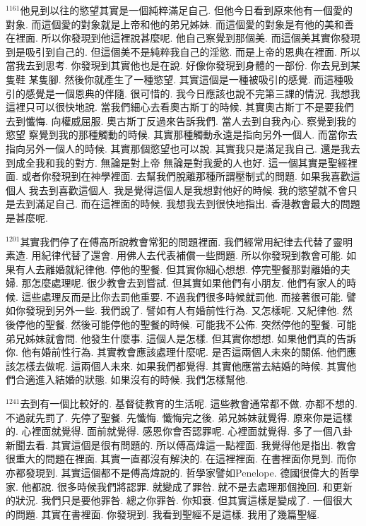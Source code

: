 \documentclass{book}
\begin{document}
$^{1161}$他見到以往的慾望其實是一個純粹滿足自己.
但他今日看到原來他有一個愛的對象.
而這個愛的對象就是上帝和他的弟兄姊妹.
而這個愛的對象是有他的美和善在裡面.
所以你發現到他這裡說甚麼呢.
他自己察覺到那個美.
而這個美其實你發現到是吸引到自己的.
但這個美不是純粹我自己的淫慾.
而是上帝的恩典在裡面.
所以當我去到思考.
你發現到其實他也是在說.
好像你發現到身體的一部份.
你去見到某隻鞋 某隻腳.
然後你就產生了一種慾望.
其實這個是一種被吸引的感覺.
而這種吸引的感覺是一個恩典的伴隨.
很可惜的.
我今日應該也說不完第三課的情況.
我想我這裡只可以很快地說.
當我們細心去看奧古斯丁的時候.
其實奧古斯丁不是要我們去到懺悔.
向權威屈服.
奧古斯丁反過來告訴我們.
當人去到自我內心.
察覺到我的慾望 察覺到我的那種觸動的時候.
其實那種觸動永遠是指向另外一個人.
而當你去指向另外一個人的時候.
其實那個慾望也可以說.
其實我只是滿足我自己.
還是我去到成全我和我的對方.
無論是對上帝 無論是對我愛的人也好.
這一個其實是聖經裡面.
或者你發現到在神學裡面.
去幫我們脫離那種所謂壓制式的問題.
如果我喜歡這個人 我去到喜歡這個人.
我是覺得這個人是我想對他好的時候.
我的慾望就不會只是去到滿足自己.
而在這裡面的時候.
我想我去到很快地指出.
香港教會最大的問題是甚麼呢.

$^{1201}$其實我們停了在傅高所說教會常犯的問題裡面.
我們經常用紀律去代替了靈明素造.
用紀律代替了還會.
用佛人去代表補償一些問題.
所以你發現到教會可能.
如果有人去離婚就紀律他.
停他的聖餐.
但其實你細心想想.
停完聖餐那對離婚的夫婦.
那怎麼處理呢.
很少教會去到嘗試.
但其實如果他們有小朋友.
他們有家人的時候.
這些處理反而是比你去罰他重要.
不過我們很多時候就罰他.
而接著很可能.
譬如你發現到另外一些.
我們說了.
譬如有人有婚前性行為.
又怎樣呢.
又紀律他.
然後停他的聖餐.
然後可能停他的聖餐的時候.
可能我不公佈.
突然停他的聖餐.
可能弟兄姊妹就會問.
他發生什麼事.
這個人是怎樣.
但其實你想想.
如果他們真的告訴你.
他有婚前性行為.
其實教會應該處理什麼呢.
是否這兩個人未來的關係.
他們應該怎樣去做呢.
這兩個人未來.
如果我們都覺得.
其實他應當去結婚的時候.
其實他們合適進入結婚的狀態.
如果沒有的時候.
我們怎樣幫他.

$^{1241}$去到有一個比較好的.
基督徒教育的生活呢.
這些教會通常都不做.
亦都不想的.
不過就先罰了.
先停了聖餐.
先懺悔.
懺悔完之後.
弟兄姊妹就覺得.
原來你是這樣的.
心裡面就覺得.
面前就覺得.
感恩你會否認罪呢.
心裡面就覺得.
多了一個八卦新聞去看.
其實這個是很有問題的.
所以傅高煒這一點裡面.
我覺得他是指出.
教會很重大的問題在裡面.
其實一直都沒有解決的.
在這裡裡面.
在書裡面你見到.
而你亦都發現到.
其實這個都不是傅高煒說的.
哲學家譬如Penelope.
德國很偉大的哲學家.
他都說.
很多時候我們將認罪.
就變成了罪咎.
就不是去處理那個挽回.
和更新的狀況.
我們只是要他罪咎.
總之你罪咎.
你知衰.
但其實這樣是變成了.
一個很大的問題.
其實在書裡面.
你發現到.
我看到聖經不是這樣.
我用了幾篇聖經.
\end{document}
